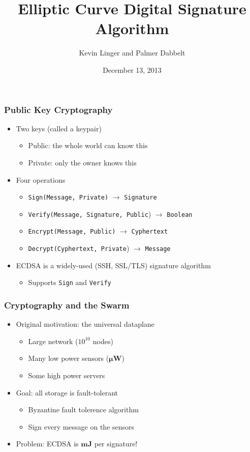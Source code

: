 \documentclass{beamer}
\title{Elliptic Curve Digital Signature Algorithm}
\author{Kevin Linger and Palmer Dabbelt}
\date{December 13, 2013}
\begin{document}
\maketitle

\begin{frame}
  \frametitle{Public Key Cryptography}


  \begin{itemize}
  \item Two keys (called a keypair)
    \begin{itemize}
    \item Public: the whole world can know this
    \item Private: only the owner knows this
    \end{itemize}
  \item Four operations
    \begin{itemize}
    \item \texttt{Sign(Message, Private)} $\rightarrow$ \texttt{Signature}
    \item \texttt{Verify(Message, Signature, Public}) $\rightarrow$ \texttt{Boolean}
    \item \texttt{Encrypt(Message, Public)} $\rightarrow$ \texttt{Cyphertext}
    \item \texttt{Decrypt(Cyphertext, Private}) $\rightarrow$ \texttt{Message}
    \end{itemize}
  \item ECDSA is a widely-used (SSH, SSL/TLS) signature algorithm
    \begin{itemize}
    \item Supports \texttt{Sign} and \texttt{Verify}
    \end{itemize}
  \end{itemize}
\end{frame}

\begin{frame}
  \frametitle{Cryptography and the Swarm}

  \begin{itemize}
  \item Original motivation: the universal dataplane
    \begin{itemize}
      \item Large network ($10^{10}$ nodes)
      \item Many low power sensors ($\bm{\mu} \mathbf{W}$)
      \item Some high power servers
    \end{itemize}
  \item Goal: all storage is fault-tolerant
    \begin{itemize}
    \item Byzantine fault tolerence algorithm
    \item Sign every message on the sensors
    \end{itemize}
  \item Problem: ECDSA is $\mathbf{mJ}$ per signature!
  \end{itemize}
\end{frame}
\end{document}
